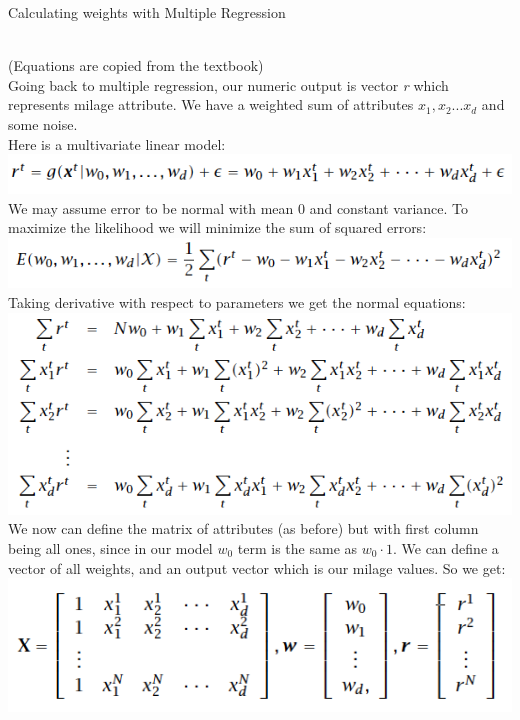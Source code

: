 \documentclass[12pt, letterpaper]{article}
\begin{document}
\begin{enumerate}[label=\Roman*.]
	{\bf \item Calculating weights with Multiple Regression} \\
	(Equations are copied from the textbook) \\
	
	Going back to multiple regression, our numeric output is vector {\it r} which represents milage attribute.  We have a weighted sum of attributes \( x_1, x_2 ... x_d\) and some noise.  \\
	Here is a multivariate linear model: \\
	\includegraphics[scale=0.5]{pics/model.png} \\
	We may assume error to be normal with mean 0 and constant variance. To maximize the likelihood we will minimize the sum of squared errors: \\
	\includegraphics[scale=0.5]{pics/errors.png} \\
	Taking derivative with respect to parameters we get the normal equations: \\
	\includegraphics[scale=0.5]{pics/normal.png} \\
	We now can define the matrix of attributes (as before) but with first column being all ones, since in our model \(w_0\) term is the same as \(w_0 \cdot 1 \). We can define a vector of all weights, and an output vector which is our milage values. So we get: \\
	\includegraphics[scale=0.5]{pics/attr.png} \\ 

\end{enumerate}
\end{document}
